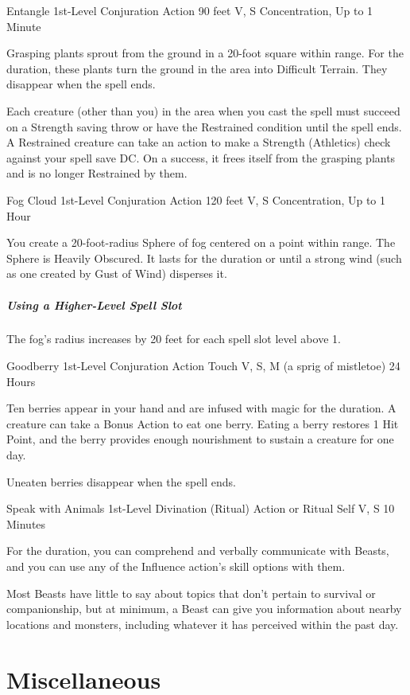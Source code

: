 \documentclass[letterpaper,openany,oneside,twocolumn]{book}
\begin{document}
\DndSpellHeader
  {Entangle}
  {1st-Level Conjuration}
  {Action}
  {90 feet}
  {V, S}
  {Concentration, Up to 1 Minute}

Grasping plants sprout from the ground in a 20-foot square within range. For the duration, these plants turn the ground in the area into Difficult Terrain. They disappear when the spell ends.

Each creature (other than you) in the area when you cast the spell must succeed on a Strength saving throw or have the Restrained condition until the spell ends. A Restrained creature can take an action to make a Strength (Athletics) check against your spell save DC. On a success, it frees itself from the grasping plants and is no longer Restrained by them.

\DndSpellHeader
  {Fog Cloud}
  {1st-Level Conjuration}
  {Action}
  {120 feet}
  {V, S}
  {Concentration, Up to 1 Hour}

You create a 20-foot-radius Sphere of fog centered on a point within range. The Sphere is Heavily Obscured. It lasts for the duration or until a strong wind (such as one created by Gust of Wind) disperses it.

\subparagraph*{Using a Higher-Level Spell Slot} The fog's radius increases by 20 feet for each spell slot level above 1.

\DndSpellHeader
  {Goodberry}
  {1st-Level Conjuration}
  {Action}
  {Touch}
  {V, S, M (a sprig of mistletoe)}
  {24 Hours}

Ten berries appear in your hand and are infused with magic for the duration. A creature can take a Bonus Action to eat one berry. Eating a berry restores 1 Hit Point, and the berry provides enough nourishment to sustain a creature for one day.

Uneaten berries disappear when the spell ends.

\DndSpellHeader
  {Speak with Animals}
  {1st-Level Divination (Ritual)}
  {Action or Ritual}
  {Self}
  {V, S}
  {10 Minutes}

For the duration, you can comprehend and verbally communicate with Beasts, and you can use any of the Influence action's skill options with them.

Most Beasts have little to say about topics that don't pertain to survival or companionship, but at minimum, a Beast can give you information about nearby locations and monsters, including whatever it has perceived within the past day.

\vfill\eject
\section*{Miscellaneous}
\end{document}
